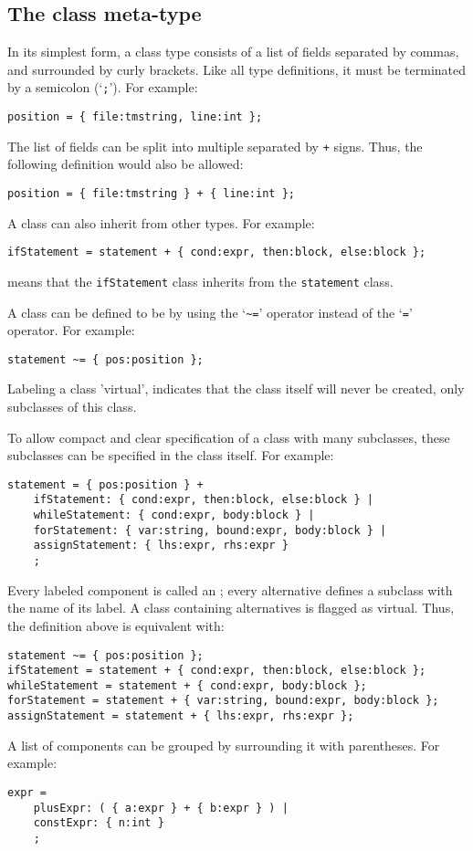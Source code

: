 \subsection{The class meta-type}
In its simplest form, a class type consists of a list of fields separated
by commas, and surrounded by curly brackets.
Like all type definitions, it must be terminated by a semicolon (`\verb';'').
For example:
\begin{verbatim}
position = { file:tmstring, line:int };
\end{verbatim}
The list of fields can be split into multiple  separated
by \verb'+' signs. Thus, the following definition would also be allowed:
\begin{verbatim}
position = { file:tmstring } + { line:int };
\end{verbatim}
A class can also inherit from other types. 
For example:
\begin{verbatim}
ifStatement = statement + { cond:expr, then:block, else:block };
\end{verbatim}
means that the {\tt ifStatement} class inherits from the {\tt statement}
class.
\par
A class can be defined to be  by using the `\verb'~=''
operator instead of the `\verb'='' operator. For example:
\begin{verbatim}
statement ~= { pos:position };
\end{verbatim}
Labeling a class 'virtual', indicates that the class itself will
never be created, only subclasses of this class.
\par
To allow compact and clear specification of a class with many
subclasses, these subclasses can be specified in the class itself.
For example:
\begin{verbatim}
statement = { pos:position } +
    ifStatement: { cond:expr, then:block, else:block } |
    whileStatement: { cond:expr, body:block } |
    forStatement: { var:string, bound:expr, body:block } |
    assignStatement: { lhs:expr, rhs:expr }
    ;
\end{verbatim}
Every labeled component is called an ;
every alternative defines a subclass with the name of its label.
A class containing alternatives is flagged as virtual.
Thus, the definition above is equivalent with:
\begin{verbatim}
statement ~= { pos:position };
ifStatement = statement + { cond:expr, then:block, else:block };
whileStatement = statement + { cond:expr, body:block };
forStatement = statement + { var:string, bound:expr, body:block };
assignStatement = statement + { lhs:expr, rhs:expr };
\end{verbatim}
\par
A list of components can be grouped by surrounding it with parentheses.
For example:
\begin{verbatim}
expr =
    plusExpr: ( { a:expr } + { b:expr } ) |
    constExpr: { n:int }
    ;
\end{verbatim}
